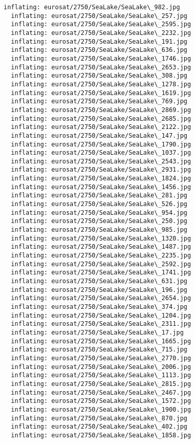 \documentclass[11pt]{article}
\begin{document}
\begin{Verbatim}[commandchars=\\\{\}]
  inflating: eurosat/2750/SeaLake/SeaLake\_982.jpg
  inflating: eurosat/2750/SeaLake/SeaLake\_257.jpg
  inflating: eurosat/2750/SeaLake/SeaLake\_2595.jpg
  inflating: eurosat/2750/SeaLake/SeaLake\_2232.jpg
  inflating: eurosat/2750/SeaLake/SeaLake\_191.jpg
  inflating: eurosat/2750/SeaLake/SeaLake\_636.jpg
  inflating: eurosat/2750/SeaLake/SeaLake\_1746.jpg
  inflating: eurosat/2750/SeaLake/SeaLake\_2653.jpg
  inflating: eurosat/2750/SeaLake/SeaLake\_308.jpg
  inflating: eurosat/2750/SeaLake/SeaLake\_1278.jpg
  inflating: eurosat/2750/SeaLake/SeaLake\_1619.jpg
  inflating: eurosat/2750/SeaLake/SeaLake\_769.jpg
  inflating: eurosat/2750/SeaLake/SeaLake\_2869.jpg
  inflating: eurosat/2750/SeaLake/SeaLake\_2685.jpg
  inflating: eurosat/2750/SeaLake/SeaLake\_2122.jpg
  inflating: eurosat/2750/SeaLake/SeaLake\_147.jpg
  inflating: eurosat/2750/SeaLake/SeaLake\_1790.jpg
  inflating: eurosat/2750/SeaLake/SeaLake\_1037.jpg
  inflating: eurosat/2750/SeaLake/SeaLake\_2543.jpg
  inflating: eurosat/2750/SeaLake/SeaLake\_2931.jpg
  inflating: eurosat/2750/SeaLake/SeaLake\_1824.jpg
  inflating: eurosat/2750/SeaLake/SeaLake\_1456.jpg
  inflating: eurosat/2750/SeaLake/SeaLake\_281.jpg
  inflating: eurosat/2750/SeaLake/SeaLake\_526.jpg
  inflating: eurosat/2750/SeaLake/SeaLake\_954.jpg
  inflating: eurosat/2750/SeaLake/SeaLake\_250.jpg
  inflating: eurosat/2750/SeaLake/SeaLake\_985.jpg
  inflating: eurosat/2750/SeaLake/SeaLake\_1320.jpg
  inflating: eurosat/2750/SeaLake/SeaLake\_1487.jpg
  inflating: eurosat/2750/SeaLake/SeaLake\_2235.jpg
  inflating: eurosat/2750/SeaLake/SeaLake\_2592.jpg
  inflating: eurosat/2750/SeaLake/SeaLake\_1741.jpg
  inflating: eurosat/2750/SeaLake/SeaLake\_631.jpg
  inflating: eurosat/2750/SeaLake/SeaLake\_196.jpg
  inflating: eurosat/2750/SeaLake/SeaLake\_2654.jpg
  inflating: eurosat/2750/SeaLake/SeaLake\_374.jpg
  inflating: eurosat/2750/SeaLake/SeaLake\_1204.jpg
  inflating: eurosat/2750/SeaLake/SeaLake\_2311.jpg
  inflating: eurosat/2750/SeaLake/SeaLake\_17.jpg
  inflating: eurosat/2750/SeaLake/SeaLake\_1665.jpg
  inflating: eurosat/2750/SeaLake/SeaLake\_715.jpg
  inflating: eurosat/2750/SeaLake/SeaLake\_2770.jpg
  inflating: eurosat/2750/SeaLake/SeaLake\_2006.jpg
  inflating: eurosat/2750/SeaLake/SeaLake\_1113.jpg
  inflating: eurosat/2750/SeaLake/SeaLake\_2815.jpg
  inflating: eurosat/2750/SeaLake/SeaLake\_2467.jpg
  inflating: eurosat/2750/SeaLake/SeaLake\_1572.jpg
  inflating: eurosat/2750/SeaLake/SeaLake\_1900.jpg
  inflating: eurosat/2750/SeaLake/SeaLake\_870.jpg
  inflating: eurosat/2750/SeaLake/SeaLake\_402.jpg
  inflating: eurosat/2750/SeaLake/SeaLake\_1858.jpg

\end{Verbatim}
\end{document}
